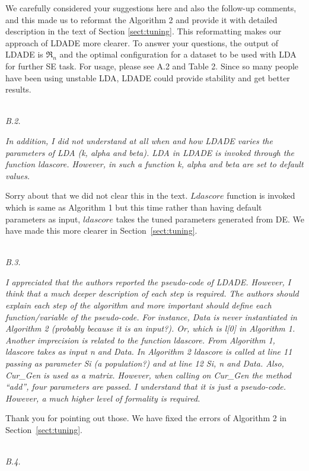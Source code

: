 \documentclass[twocolumn,5p,sort&compress]{elsarticle}
\theoremstyle{break}
\begin{document}
We carefully considered your suggestions here and also the follow-up comments, and this made us to reformat the Algorithm 2 and provide it with detailed description in the text of Section \ref{sect:tuning}. This reformatting makes our approach of LDADE more clearer. To answer your questions, the output of LDADE is $\Re_n$ and the optimal configuration for a dataset to be used with LDA for further SE task. For usage, please see A.2 and Table 2. Since so many people have been using unstable LDA, LDADE could provide stability and get better results.

\noindent
\textit{\\B.2.}  

\textit{In addition, I did not understand at all when and how LDADE varies the parameters of LDA (k, alpha and beta). LDA in LDADE is invoked through the function ldascore. However, in such a function k, alpha and beta are set to default values.\\}

Sorry about that we did not clear this in the text. $Ldascore$ function is invoked which is same as Algorithm 1 but this time rather than having default parameters as input, $ldascore$ takes the tuned parameters generated from DE. We have made this more clearer in Section~\ref{sect:tuning}.

\noindent
\textit{\\B.3.} 

\textit{I appreciated that the authors reported the pseudo-code of LDADE. However, I think that a much deeper description of each step is required. The authors should explain each step of the algorithm and more important should define each function/variable of the pseudo-code. For instance, Data is never instantiated in Algorithm 2 (probably because it is an input?). Or, which is l[0] in Algorithm 1. Another imprecision is related to the function ldascore. From Algorithm 1, ldascore takes as input n and Data. In Algorithm 2 ldascore is called at line 11 passing as parameter Si (a population?) and at line 12 Si, n and Data. Also, Cur\_Gen is used as a matrix. However, when calling on Cur\_Gen the method ``add'', four parameters are passed. I understand that it is just a pseudo-code. However, a much higher level of formality is required.\\}

Thank you for pointing out those. We have fixed the errors of Algorithm 2 in Section~\ref{sect:tuning}. 

\noindent
\textit{\\B.4.} 
\end{document}
